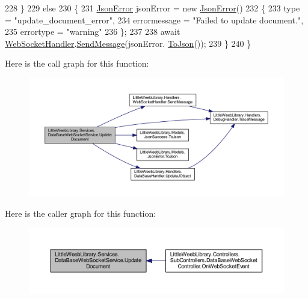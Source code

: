 \begin{DoxyCode}
228             \}
229             \textcolor{keywordflow}{else}
230             \{
231                 \mbox{\hyperlink{class_little_weeb_library_1_1_models_1_1_json_error}{JsonError}} jsonError = \textcolor{keyword}{new} \mbox{\hyperlink{class_little_weeb_library_1_1_models_1_1_json_error}{JsonError}}()
232                 \{
233                     type = \textcolor{stringliteral}{"update\_document\_error"},
234                     errormessage = \textcolor{stringliteral}{"Failed to update document."},
235                     errortype = \textcolor{stringliteral}{"warning"}
236                 \};
237 
238                 await \mbox{\hyperlink{class_little_weeb_library_1_1_handlers_1_1_web_socket_handler}{WebSocketHandler}}.\mbox{\hyperlink{class_little_weeb_library_1_1_handlers_1_1_web_socket_handler_a1de289d54d665a32c93478c68d3e6ad0}{SendMessage}}(jsonError.
      \mbox{\hyperlink{class_little_weeb_library_1_1_models_1_1_json_error_a0e3e7dd2e2990404b7f0461742b23440}{ToJson}}());
239             \}
240         \}
\end{DoxyCode}
Here is the call graph for this function\+:\nopagebreak
\begin{figure}[H]
\begin{center}
\leavevmode
\includegraphics[width=350pt]{class_little_weeb_library_1_1_services_1_1_data_base_web_socket_service_a3771a51f4d0aab2cd4f65676427d0902_cgraph}
\end{center}
\end{figure}
Here is the caller graph for this function\+:\nopagebreak
\begin{figure}[H]
\begin{center}
\leavevmode
\includegraphics[width=350pt]{class_little_weeb_library_1_1_services_1_1_data_base_web_socket_service_a3771a51f4d0aab2cd4f65676427d0902_icgraph}
\end{center}
\end{figure}


